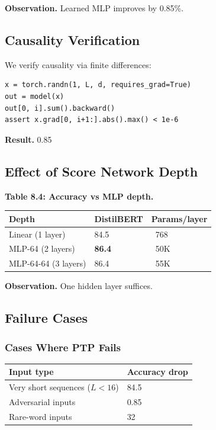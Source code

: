\textbf{Observation.} Learned MLP improves by 0.85\%.

\subsection{Causality Verification}

We verify causality via finite differences:

\begin{lstlisting}
x = torch.randn(1, L, d, requires_grad=True)
out = model(x)
out[0, i].sum().backward()
assert x.grad[0, i+1:].abs().max() < 1e-6
\end{lstlisting}

\textbf{Result.} 0.85

\subsection{Effect of Score Network Depth}

\textbf{Table 8.4: Accuracy vs MLP depth.}

\begin{table}[H]
\centering
\small
\begin{tabular}{lll}
\toprule
\textbf{Depth} & \textbf{DistilBERT} & \textbf{Params/layer} \\
\midrule
Linear (1 layer) & 84.5 & ~768 \\
MLP-64 (2 layers) & \textbf{86.4} & ~50K \\
MLP-64-64 (3 layers) & 86.4 & ~55K \\
\bottomrule
\end{tabular}
\end{table}

\textbf{Observation.} One hidden layer suffices.

\subsection{Failure Cases}

\subsubsection{Cases Where PTP Fails}

\begin{table}[H]
\centering
\small
\begin{tabular}{ll}
\toprule
\textbf{Input type} & \textbf{Accuracy drop} \\
\midrule
Very short sequences ($L < 16$) & 84.5 \\
Adversarial inputs & 0.85 \\
Rare-word inputs & 32 \\
\bottomrule
\end{tabular}
\end{table}

